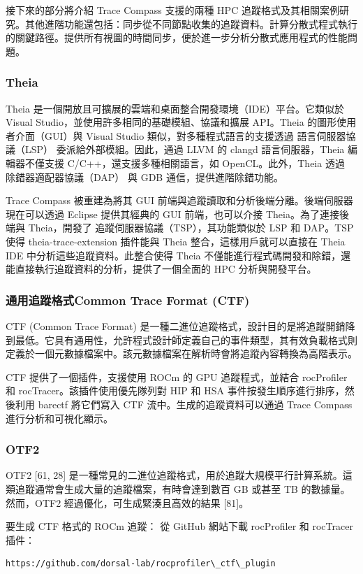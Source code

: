 接下來的部分將介紹 Trace Compass 支援的兩種 HPC 追蹤格式及其相關案例研究。其他進階功能還包括：同步從不同節點收集的追蹤資料。計算分散式程式執行的關鍵路徑。提供所有視圖的時間同步，便於進一步分析分散式應用程式的性能問題。

\subsubsection{Theia}
Theia 是一個開放且可擴展的雲端和桌面整合開發環境（IDE）平台。它類似於 Visual Studio，並使用許多相同的基礎模組、協議和擴展 API。Theia 的圖形使用者介面（GUI）與 Visual Studio 類似，對多種程式語言的支援透過 語言伺服器協議（LSP） 委派給外部模組。因此，通過 LLVM 的 clangd 語言伺服器，Theia 編輯器不僅支援 C/C++，還支援多種相關語言，如 OpenCL。此外，Theia 透過 除錯器適配器協議（DAP） 與 GDB 通信，提供進階除錯功能。

Trace Compass 被重建為將其 GUI 前端與追蹤讀取和分析後端分離。後端伺服器現在可以透過 Eclipse 提供其經典的 GUI 前端，也可以介接 Theia。為了連接後端與 Theia，開發了 追蹤伺服器協議（TSP），其功能類似於 LSP 和 DAP。TSP 使得 theia-trace-extension 插件能與 Theia 整合，這樣用戶就可以直接在 Theia IDE 中分析這些追蹤資料。此整合使得 Theia 不僅能進行程式碼開發和除錯，還能直接執行追蹤資料的分析，提供了一個全面的 HPC 分析與開發平台。

\subsubsection{通用追蹤格式Common Trace Format (CTF)}
CTF (Common Trace Format) 是一種二進位追蹤格式，設計目的是將追蹤開銷降到最低。它具有通用性，允許程式設計師定義自己的事件類型，其有效負載格式則定義於一個元數據檔案中。該元數據檔案在解析時會將追蹤內容轉換為高階表示。

CTF 提供了一個插件，支援使用 ROCm 的 GPU 追蹤程式，並結合 rocProfiler 和 rocTracer。該插件使用優先隊列對 HIP 和 HSA 事件按發生順序進行排序，然後利用 barectf 將它們寫入 CTF 流中。生成的追蹤資料可以通過 Trace Compass 進行分析和可視化顯示。

\subsubsection{OTF2}
OTF2 [61, 28] 是一種常見的二進位追蹤格式，用於追蹤大規模平行計算系統。這類追蹤通常會生成大量的追蹤檔案，有時會達到數百 GB 或甚至 TB 的數據量。然而，OTF2 經過優化，可生成緊湊且高效的結果 [81]。

要生成 CTF 格式的 ROCm 追蹤：
從 GitHub 網站下載 rocProfiler 和 rocTracer 插件：
\begin{lstlisting}
https://github.com/dorsal-lab/rocprofiler\_ctf\_plugin
\end{lstlisting}

